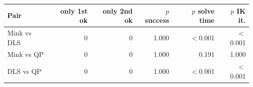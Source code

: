 \begin{tabular}{lrrrrr}
\toprule
Pair & only 1st ok & only 2nd ok & $p$ success & $p$ solve time & $p$ IK it.\\
\midrule
Mink vs DLS & 0 & 0 & 1.000 & $<$0.001 & $<$0.001\\
Mink vs QP & 0 & 0 & 1.000 & 0.191 & 1.000\\
DLS vs QP & 0 & 0 & 1.000 & $<$0.001 & $<$0.001\\
\bottomrule
\end{tabular}
